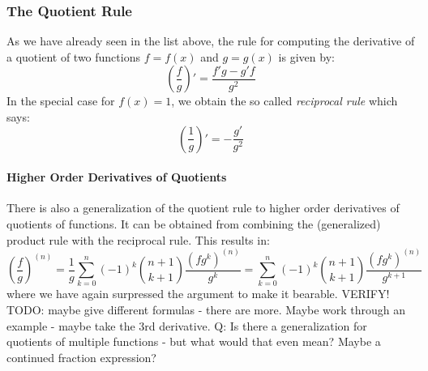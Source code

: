 





\subsubsection{The Quotient Rule} 
As we have already seen in the list above, the rule for computing the derivative of a quotient of two functions $f = f(x)$ and $g = g(x)$ is given by:
\begin{equation}
\left( \frac{f}{g} \right) ' = 
\frac{f' g - g' f}{g^2}
\end{equation}
In the special case for $f(x) = 1$, we obtain the so called \emph{reciprocal rule} which says:
\begin{equation}
\left( \frac{1}{g} \right) ' = 
- \frac{g'}{g^2}
\end{equation}


\paragraph{Higher Order Derivatives of Quotients}
There is also a generalization of the quotient rule to higher order derivatives of quotients of functions. It can be obtained from combining the (generalized) product rule with the reciprocal rule. This results in:
\begin{equation}
\left( \frac{f}{g} \right) ^{(n)} 
= \frac{1}{g} \sum_{k=0}^{n} (-1)^k \binom{n+1}{k+1} \frac{(f g^k)^{(n)}}{g^k}
= \sum_{k=0}^{n} (-1)^k \binom{n+1}{k+1} \frac{(f g^k)^{(n)}}{g^{k+1}}
\end{equation}
where we have again surpressed the argument to make it bearable. VERIFY! TODO: maybe give different formulas - there are more. Maybe work through an example - maybe take the 3rd derivative. Q: Is there a generalization for quotients of multiple functions - but what would that even mean? Maybe a continued fraction expression? 

